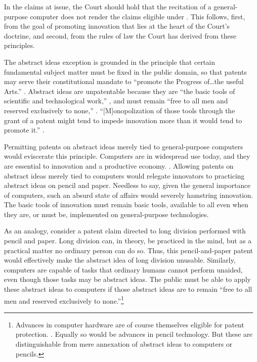 \documentclass{scotus}
\begin{document}
In the claims at issue, the Court should hold that the recitation of a
general-purpose computer does not render the claims eligible under .
This follows, first, from the goal of promoting innovation that lies at the
heart of
the Court's  doctrine, and second, from the rules of law
the Court has derived from these principles.

The abstract ideas exception is grounded in the principle that certain
fundamental subject matter must be fixed in the public domain, so that
patents may serve their constitutional mandate to ``promote the Progress
of\ldots the useful Arts.'' .
Abstract ideas are unpatentable because they
are ``the basic tools of scientific and technological work,'' , and must remain ``free to all men and reserved exclusively to none,''
. ``[M]onopolization
of those tools through the grant of a patent might tend to impede innovation
more than it would tend to promote it.'' .

Permitting patents on abstract ideas merely tied to general-purpose computers
would eviscerate this principle.
Computers are in
widespread use today, and they are essential to innovation and a productive
economy. . 
Allowing patents on abstract ideas merely tied to computers
would relegate
innovators to practicing abstract ideas on pencil and
paper. Needless to say, given the general importance of computers, such an
absurd state of affairs would severely hamstring innovation.
The basic tools of innovation must remain basic tools, available to all even
when they are, or must be, implemented on general-purpose technologies.

As an analogy, consider a patent claim directed to long division performed with
pencil and paper. Long division can, in theory, be practiced in the mind, but
as a practical matter no ordinary person can do so. Thus, this pencil-and-paper
patent would effectively make the abstract idea of long division unusable.
Similarly, computers are capable of tasks that ordinary
humans cannot perform unaided, even though those tasks may be
abstract ideas. The public must be able to apply these abstract ideas to
computers if those abstract ideas are to
remain ``free to all men and reserved exclusively to none.''\footnote{%
Advances in computer hardware are of course themselves eligible for patent
protection.  . Equally so would be advances in pencil technology. But these are
distinguishable from mere annexation of abstract ideas to computers or pencils.}
\end{document}
